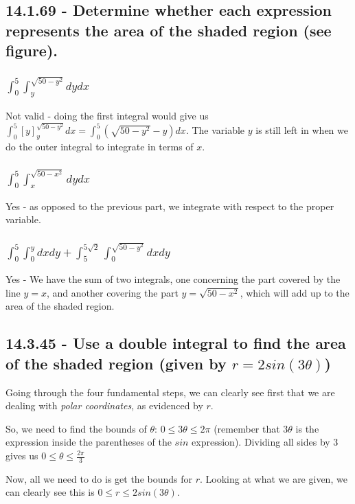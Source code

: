 \documentclass{article}
\begin{document}
\subsection{14.1.69 - Determine whether each expression represents the area of the shaded region (see figure).}
\subsubsection{$\int_{0}^{5}\int_{y}^{\sqrt{50 - y^{2}}}dydx$}
\par\noindent\large Not valid - doing the first integral would give us $\int_{0}^{5}[y]^{\sqrt{50 - y^{2}}}_{y}dx = \int_{0}^{5}(\sqrt{50 - y^{2}} - y) dx$.  The variable $y$ is still left in when we do the outer integral to integrate in terms of $x$.

\subsubsection{$\int_{0}^{5}\int_{x}^{\sqrt{50 - x^{2}}}dydx$}
\par\noindent\large Yes - as opposed to the previous part, we integrate with respect to the proper variable.

\subsubsection{$\int_{0}^{5}\int_{0}^{y}dxdy + \int_{5}^{5\sqrt{2}}\int_{0}^{\sqrt{50 - y^{2}}}dxdy$}
\par\noindent\large Yes - We have the sum of two integrals, one concerning the part covered by the line $y = x$, and another covering the part $y = \sqrt{50 - x^{2}}$, which will add up to the area of the shaded region.

\subsection{14.3.45 - Use a double integral to find the area of the shaded region (given by $r = 2sin(3\theta)$)}
\par\noindent\large Going through the four fundamental steps, we can clearly see first that we are dealing with \textit{polar coordinates}, as evidenced by $r$.
\par\noindent\large So, we need to find the bounds of $\theta$: $0 \leq 3\theta \leq 2\pi$ (remember that $3\theta$ is the expression inside the parentheses of the $sin$ expression).  Dividing all sides by 3 gives us $0 \leq \theta \leq \frac{2\pi}{3}$
\par\noindent\large Now, all we need to do is get the bounds for $r$.  Looking at what we are given, we can clearly see this is $0 \leq r \leq 2sin(3\theta)$.\vspace{0.25cm}
\end{document}
